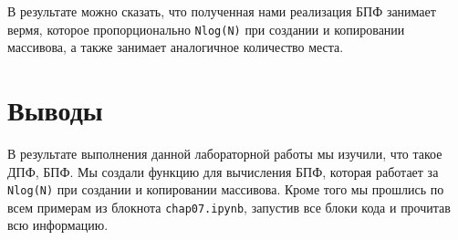 \documentclass[a4paper]{article}
\begin{document}
            В результате можно сказать, что полученная нами реализация БПФ занимает вермя, которое пропорционально \texttt{Nlog(N)} при создании и копировании массивова, а также занимает аналогичное количество места.
            
    \newpage
        \section{Выводы}
             В результате выполнения данной лабораторной работы мы изучили, что такое ДПФ, БПФ. Мы создали функцию для вычисления БПФ, которая работает за \texttt{Nlog(N)} при создании и копировании массивова. Кроме того мы прошлись по всем примерам из блокнота \texttt{chap07.ipynb}, запустив все блоки кода и прочитав всю информацию.
            
\end{document}
